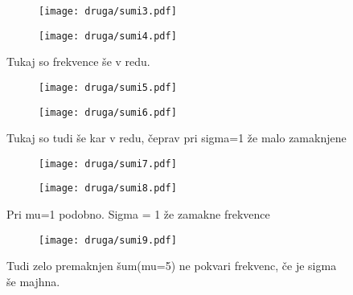 \documentclass{article}
\begin{document}
\begin{figure}[H]
\centering
\begin{subfigure}{.49\textwidth}
\texttt{[image: druga/sumi3.pdf]}
\end{subfigure}
\begin{subfigure}{.49\textwidth}
\texttt{[image: druga/sumi4.pdf]}
\end{subfigure}
\caption*{Tukaj so frekvence še v redu.}
\end{figure}

\begin{figure}[H]
\centering
\begin{subfigure}{.49\textwidth}
\texttt{[image: druga/sumi5.pdf]}
\end{subfigure}
\begin{subfigure}{.49\textwidth}
\texttt{[image: druga/sumi6.pdf]}
\end{subfigure}
\caption*{Tukaj so tudi še kar v redu, čeprav pri sigma=1 že malo zamaknjene}
\end{figure}

\begin{figure}[H]
\centering
\begin{subfigure}{.49\textwidth}
\texttt{[image: druga/sumi7.pdf]}
\end{subfigure}
\begin{subfigure}{.49\textwidth}
\texttt{[image: druga/sumi8.pdf]}
\end{subfigure}
\caption*{Pri mu=1 podobno. Sigma = 1 že zamakne frekvence}
\end{figure}

\begin{figure}[H]
\centering
\begin{subfigure}{.7\textwidth}
\texttt{[image: druga/sumi9.pdf]}
\end{subfigure}
\caption*{Tudi zelo premaknjen šum(mu=5) ne pokvari frekvenc, če je sigma še majhna.}
\end{figure}
\end{document}
